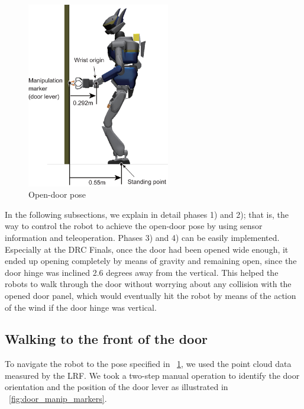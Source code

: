 \begin{figure}[t]
  \centering
  \includegraphics[width = 6.25cm]{img/door_approaching_config}
  \caption{Open-door pose}
  \label{fig:door_approaching_config}
\end{figure}



In the following subsections, we explain in detail phases 1) and 2); that is,
the way to control the robot to achieve the open-door pose by using sensor information
and teleoperation.
Phases 3) and 4) can be easily implemented. 
Especially at the DRC Finals, once the door had been opened wide enough, it ended up opening
completely by means of gravity and remaining open, since the door hinge was inclined 2.6 degrees
away from the vertical.
This helped the robots to walk through the door without worrying about any collision with
the opened door panel, which would eventually hit the robot by means of the action of the wind if the door hinge 
was vertical. 

\subsection{Walking to the front of the door}
%
To navigate the robot to the pose specified in \figurename~\ref{fig:door_approaching_config},
we used the point cloud data measured by the LRF. 
We took a two-step manual operation to identify the door orientation and the position of the
door lever as illustrated in \figurename~\ref{fig:door_manip_markers}.


